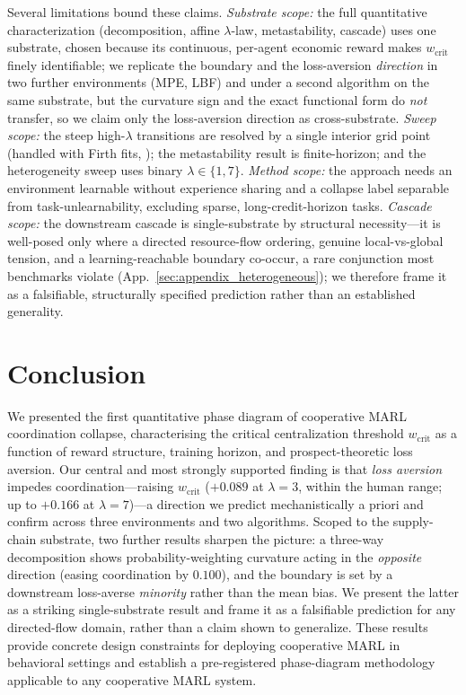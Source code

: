 \documentclass[letterpaper]{article}
\theoremstyle{plain}
\newcommand{\wcrit}{w_{\mathrm{crit}}}
\begin{document}
Several limitations bound these claims. \emph{Substrate scope:} the full
quantitative characterization (decomposition, affine $\lambda$-law, metastability,
cascade) uses one substrate, chosen because its continuous, per-agent economic
reward makes $\wcrit$ finely identifiable; we replicate the boundary and the
loss-aversion \emph{direction} in two further environments (MPE, LBF) and under a
second algorithm on the same substrate, but the curvature sign and the exact
functional form do \emph{not} transfer, so we claim only the loss-aversion
direction as cross-substrate. \emph{Sweep scope:} the steep high-$\lambda$
transitions are resolved by a single interior grid point (handled with Firth
fits, ); the metastability result is finite-horizon; and
the heterogeneity sweep uses binary $\lambda\in\{1,7\}$. \emph{Method scope:} the
approach needs an environment learnable without experience sharing and a collapse
label separable from task-unlearnability, excluding sparse, long-credit-horizon
tasks. \emph{Cascade scope:} the downstream cascade is single-substrate by
structural necessity---it is well-posed only where a directed resource-flow
ordering, genuine local-vs-global tension, and a learning-reachable boundary
co-occur, a rare conjunction most benchmarks violate
(App.~\ref{sec:appendix_heterogeneous}); we therefore frame it as a falsifiable,
structurally specified prediction rather than an established generality.

\section{Conclusion}
\label{sec:conclusion}

We presented the first quantitative phase diagram of cooperative MARL
coordination collapse, characterising the critical centralization threshold
$\wcrit$ as a function of reward structure, training horizon, and
prospect-theoretic loss aversion.
Our central and most strongly supported finding is that \emph{loss aversion}
impedes coordination---raising $\wcrit$ ($+0.089$ at $\lambda{=}3$, within the
human range; up to $+0.166$ at $\lambda{=}7$)---a direction we predict
mechanistically a priori and confirm across three environments and two
algorithms. Scoped to the supply-chain substrate, two further results sharpen
the picture: a three-way decomposition shows probability-weighting curvature
acting in the \emph{opposite} direction (easing coordination by $0.100$), and
the boundary is set by a downstream loss-averse \emph{minority} rather than the
mean bias. We present the latter as a striking single-substrate result and frame
it as a falsifiable prediction for any directed-flow domain, rather than a
claim shown to generalize.
These results provide concrete design constraints for deploying cooperative
MARL in behavioral settings and establish a pre-registered phase-diagram
methodology applicable to any cooperative MARL system.
\end{document}
